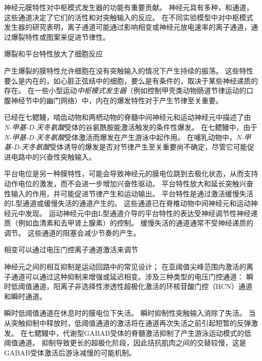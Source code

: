 \begin{proposition}[神经元离子通道有助于中枢模式发生器功能] \label{box:33_2}
	
	\quad \quad 神经元膜特性对中枢模式发生器的功能有重要贡献。
	神经元具有多种，和通道，这些通道决定了它们的活性和对突触输入的反应。
	在不同实验模型中对中枢模式发生器的研究表明，离子通道可能通过影响相变或神经元放电速率的离子通道，通过爆裂特性或图案来促进节律性。
	
	\quad \quad 爆裂和平台特性放大了细胞反应
	
	\quad \quad 产生爆裂的膜特性允许细胞在没有突触输入的情况下产生持续的振荡。
	这些特性要么是内在的，如心脏正弦结中的细胞，要么是有条件的，取决于某些神经递质的存在。
	在一些小型运动\textit{中枢模式发生器}（例如控制甲壳类动物肠道节律运动的口腹神经节中的幽门网络）中，内在的爆发特性对于产生节律至关重要。
	
	\quad \quad 已经在七鳃鳗，啮齿动物和两栖动物的脊髓中间神经元和运动神经元中描述了由\textit{N-甲基-D-天冬氨酸}受体的谷氨酰胺能激活触发的条件性爆发。
	在七鳃鳗中，由于\textit{N-甲基-D-天冬氨酸}受体激活而爆发在产生游泳中起作用。
	在哺乳动物中，\textit{N-甲基-D-天冬氨酸}受体诱导的爆发是否对节律产生至关重要尚不确定，尽管它可能促进电路中的兴奋性突触输入。
	
	\quad \quad 平台电位是另一种膜特性，可能会导致神经元的膜电位跳到去极化状态，从而支持动作电位的激发，而不会进一步增加兴奋性驱动。
	平台特性放大和延长突触兴奋性输入的作用，并可能促进节律产生和运动输出。
	平台特性是通过激活缓慢失活的L型通道或缓慢失活的通道产生的。
	这些通道已在脊椎动物中间神经元和运动神经元中发现。
	运动神经元中由L型通道介导的平台特性的表达受神经调节性神经递质（例如血清素和去甲肾上腺素）的控制。
	缓慢失活的通道通常不受神经递质的调节。
	这些通道的阻塞会减少节奏的产生。
	
	\quad \quad 相变可以通过电压门控离子通道激活来调节
	
	\quad \quad 神经元之间的相互抑制是运动回路中的常见设计；
	在亚阈值尖峰范围内激活的离子通道可以通过这种抑制来增强或延迟相变。涉及三种类型的电压门控通道：
	瞬时低阈值通道，阳离子非选择性渗透性超极化激活的环核苷酸门控（HCN）通道和瞬时通道。
	
	\quad \quad 瞬时低阈值通道在休息时的膜电位下失活。
	瞬时抑制性突触输入消除了失活。
	当从突触抑制中释放时，低阈值通道的激活将在通道再次失活之前引起短暂的反弹激发。
	在七鳃鳗中，代谢型GABAB受体的脊髓激活抑制了产生游泳运动模式的低阈值通道。
	抑制导致更长的超极化阶段，因此拮抗肌肉之间的交替较慢，这是GABAB受体激活后游泳减慢的可能机制。
	

\end{proposition}
